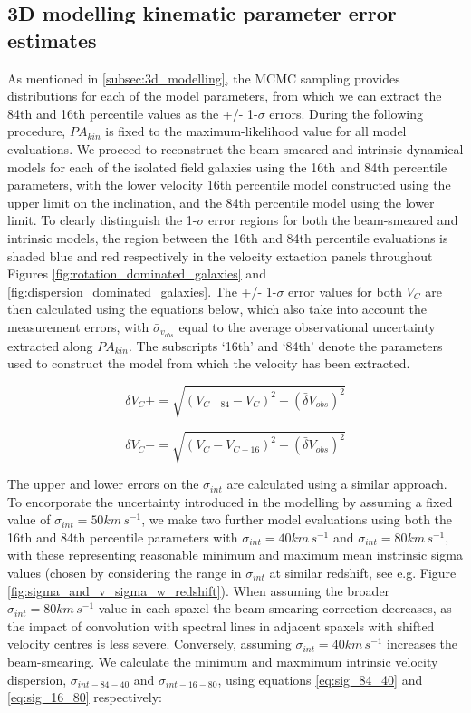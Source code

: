 \documentclass[fleqn,usenatbib]{mnras}
\begin{document}
\subsection{3D modelling kinematic parameter error estimates}\label{appsubsec:model_errors}
As mentioned in \cref{subsec:3d_modelling}, the MCMC sampling provides distributions for each of the model parameters, from which we can extract the 84th and 16th percentile values as the +/- 1-$\sigma$ errors.
During the following procedure, $PA_{kin}$ is fixed to the maximum-likelihood value for all model evaluations.
We proceed to reconstruct the beam-smeared and intrinsic dynamical models for each of the isolated field galaxies using the 16th and 84th percentile parameters, with the lower velocity 16th percentile model constructed using the upper limit on the inclination, and the 84th percentile model using the lower limit.
To clearly distinguish the 1-$\sigma$ error regions for both the beam-smeared and intrinsic models, the region between the 16th and 84th percentile evaluations is shaded blue and red respectively in the velocity extaction panels throughout Figures \ref{fig:rotation_dominated_galaxies} and \ref{fig:dispersion_dominated_galaxies}.
The +/- 1-$\sigma$ error values for both $V_{C}$ are then calculated using the equations below, which also take into account the measurement errors, with $\bar{\sigma}_{v_{obs}}$ equal to the average observational uncertainty extracted along $PA_{kin}$.
The subscripts `16th' and `84th' denote the parameters used to construct the model from which the velocity has been extracted.


\begin{equation}\label{eq:VC_plus}
   \delta V_{C}+ = \sqrt{\left(V_{C-84} - V_{C}\right)^{2} + \left(\bar{\delta}V_{obs}\right)^{2}}
\end{equation}

\begin{equation}\label{eq:VC_minus}
   \delta V_{C}- = \sqrt{\left(V_{C} - V_{C-16}\right)^{2}  + \left(\bar{\delta}V_{obs}\right)^{2}}
\end{equation}

\noindent
The upper and lower errors on the $\sigma_{int}$ are calculated using a similar approach.
To encorporate the uncertainty introduced in the modelling by assuming a fixed value of $\sigma_{int}=50 km\,s^{-1}$, we make two further model evaluations using both the 16th and 84th percentile parameters with $\sigma_{int} = 40 km\,s^{-1}$ and $\sigma_{int} = 80 km\,s^{-1}$, with these representing reasonable minimum and maximum mean instrinsic sigma values (chosen by considering the range in $\sigma_{int}$ at similar redshift, see e.g. Figure \ref{fig:sigma_and_v_sigma_w_redshift}).
When assuming the broader $\sigma_{int} = 80 km\,s^{-1}$ value in each spaxel the beam-smearing correction decreases, as the impact of convolution with spectral lines in adjacent spaxels with shifted velocity centres is less severe.
Conversely, assuming $\sigma_{int} = 40 km\,s^{-1}$ increases the beam-smearing.
We calculate the minimum and maxmimum intrinsic velocity dispersion, $\sigma_{int-84-40}$ and $\sigma_{int-16-80}$, using equations \ref{eq:sig_84_40} and \ref{eq:sig_16_80} respectively:
\end{document}
